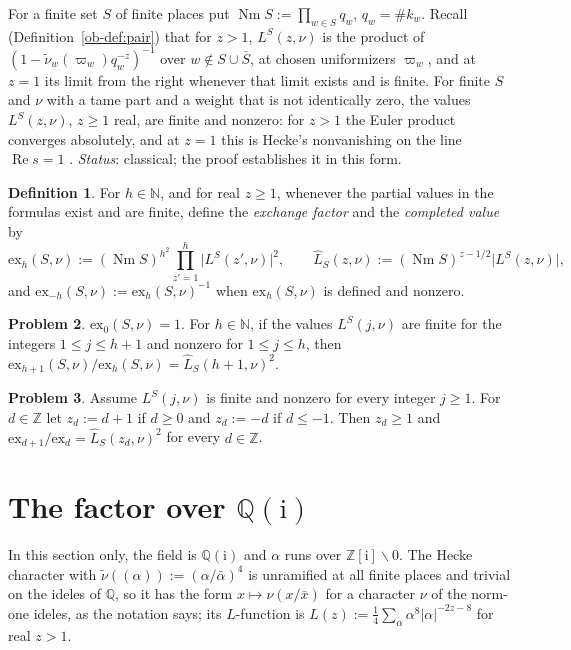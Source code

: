 \documentclass[reqno]{amsart}
\theoremstyle{definition}
\newtheorem{problem}{Problem}[section]
\newtheorem{definition}[problem]{Definition}
\theoremstyle{plain}
\newcommand{\Z}{\mathbb Z}
\newcommand{\Q}{\mathbb Q}
\newcommand{\Nm}{\operatorname{Nm}}
\newcommand{\ex}{\mathrm{ex}}
\newcommand{\ii}{\mathrm{i}}
\begin{document}
For a finite set \(S\) of finite places put \(\Nm S := \prod_{w \in S} q_w\), \(q_w = \#k_w\).  Recall (Definition~\ref{ob-def:pair}) that for \(z > 1\), \(L^S(z,\nu)\) is the product of \((1-\tilde\nu_w(\varpi_w)q_w^{-z})^{-1}\) over \(w \notin S\cup\bar S\), at chosen uniformizers \(\varpi_w\), and at \(z = 1\) its limit from the right whenever that limit exists and is finite.  For finite \(S\) and \(\nu\) with a tame part and a weight that is not identically zero, the values \(L^S(z,\nu)\), \(z \ge 1\) real, are finite and nonzero: for \(z > 1\) the Euler product converges absolutely, and at \(z = 1\) this is Hecke's nonvanishing on the line \(\operatorname{Re} s = 1\) \cite[Ch.~XV]{La}.  \emph{Status}: classical; the proof establishes it in this form.

\begin{definition}\label{def:exchange-factor}
For \(h \in \mathbb N\), and for real \(z \ge 1\), whenever the partial values in the formulas exist and are finite, define the \emph{exchange factor} and the \emph{completed value} by
\[
  \ex_h(S,\nu) := (\Nm S)^{h^2}\prod_{z'=1}^h\lvert L^S(z',\nu)\rvert^2, \qquad \hat L_S(z,\nu) := (\Nm S)^{z - 1/2}\lvert L^S(z,\nu)\rvert ,
\]
and \(\ex_{-h}(S,\nu) := \ex_h(S,\nu)^{-1}\) when \(\ex_h(S,\nu)\) is defined and nonzero.
\end{definition}

\begin{problem}\label{pr:ex-step}
\(\ex_0(S,\nu) = 1\).  For \(h \in \mathbb N\), if the values \(L^S(j,\nu)\) are finite for the integers \(1 \le j \le h+1\) and nonzero for \(1 \le j \le h\), then \(\ex_{h+1}(S,\nu)/\ex_h(S,\nu) = \hat L_S(h+1,\nu)^2\).
\end{problem}

\begin{problem}\label{pr:ex-neg}
Assume \(L^S(j,\nu)\) is finite and nonzero for every integer \(j \ge 1\).  For \(d \in \Z\) let \(z_d := d+1\) if \(d \ge 0\) and \(z_d := -d\) if \(d \le -1\).  Then \(z_d \ge 1\) and \(\ex_{d+1}/\ex_d = \hat L_S(z_d,\nu)^2\) for every \(d \in \Z\).
\end{problem}

\section{The factor over \texorpdfstring{\(\Q(\ii)\)}{Q(i)}}\label{sec:gauss}

In this section only, the field is \(\Q(\ii)\) and \(\alpha\) runs over \(\Z[\ii] \smallsetminus 0\).  The Hecke character with \(\tilde\nu((\alpha)) := (\alpha/\bar\alpha)^4\) is unramified at all finite places and trivial on the ideles of \(\Q\), so it has the form \(x \mapsto \nu(x/\bar x)\) for a character \(\nu\) of the norm-one ideles, as the notation says; its \(L\)-function is \(L(z) := \frac14\sum_\alpha \alpha^8\lvert\alpha\rvert^{-2z-8}\) for real \(z > 1\).
\end{document}
